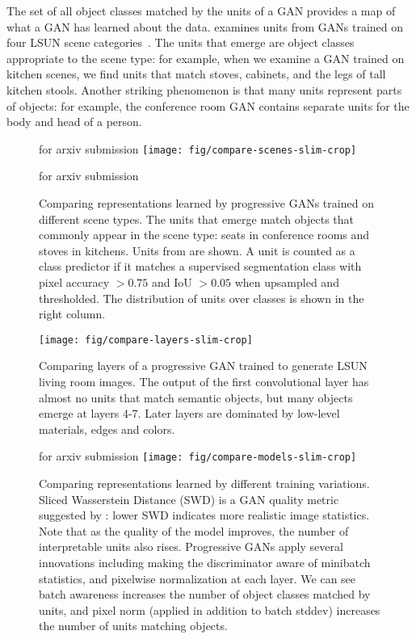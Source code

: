 \documentclass{article} %
\def\arxiv{for arxiv submission}
\begin{document}
The set of all object classes matched by the units of a GAN provides a map of what a GAN has learned about the data.  examines units from GANs trained on four LSUN scene categories~\citep{yu2015lsun}. The units that emerge are object classes appropriate to the scene type: for example, when we examine a GAN trained on kitchen scenes, we find units that match stoves, cabinets, and the legs of tall kitchen stools.  Another striking phenomenon is that many units represent parts of objects: for example, the conference room GAN contains separate units for the body and head of a person.
\begin{figure}
\ifdefined\arxiv
\vspace{-15pt}
\fi
\centering
\texttt{[image: fig/compare-scenes-slim-crop]}
\vspace{-11pt}
\caption{Comparing representations learned by progressive GANs trained on different scene types.  The units that emerge match objects that commonly appear in the scene type: seats in conference rooms and stoves in kitchens.  Units from  are shown.  A unit is counted as a class predictor if it matches a supervised segmentation class with pixel accuracy $> 0.75$ and IoU $> 0.05$ when upsampled and thresholded. The distribution of units over classes is shown in the right column.}
\ifdefined\arxiv
\vspace{-5pt}
\else
\vspace{-10pt}
\fi
\end{figure}\begin{figure}[t]
\hspace{3mm}\texttt{[image: fig/compare-layers-slim-crop]}
\vspace{-10pt}
\caption{Comparing layers of a progressive GAN trained to generate LSUN living room images. The output of the first convolutional layer has almost no units that match semantic objects, but many objects emerge at layers 4-7.  Later layers are dominated by low-level materials, edges and colors.}
\end{figure}\begin{figure}[t]
\ifdefined\arxiv
\vspace{-25pt}
\else
\fi
\hspace{3mm}\texttt{[image: fig/compare-models-slim-crop]}
\vspace{-10pt}
\caption{Comparing  representations learned by different training variations. Sliced Wasserstein Distance (SWD) is a GAN quality metric suggested by \cite{karras2018progressive}: lower SWD indicates more realistic image statistics.  Note that as the quality of the model improves, the number of interpretable units also rises.  Progressive GANs apply several innovations including making the discriminator aware of minibatch statistics, and pixelwise normalization at each layer.  We can see batch awareness increases the number of object classes matched by units, and pixel norm (applied in addition to batch stddev) increases the number of units matching objects.}

\end{figure}
\end{document}
